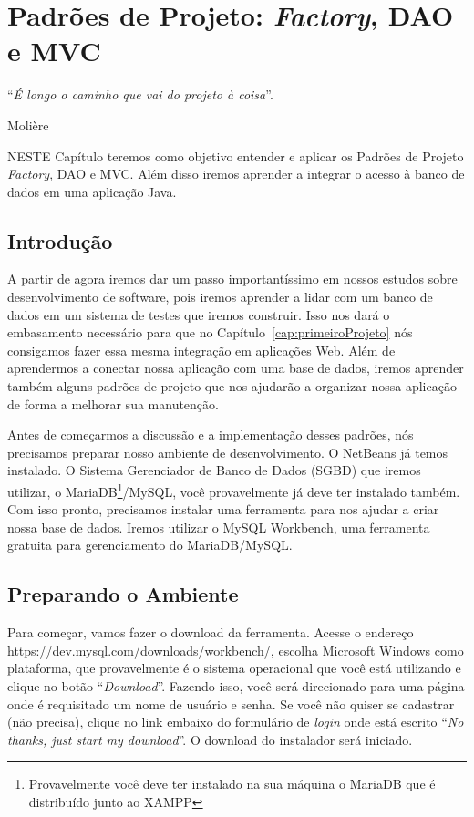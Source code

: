 \chapter{Padrões de Projeto: \textit{Factory}, DAO e MVC}\label{cap:padroesDeProjeto}
\epigraph{``\textit{É longo o caminho que vai do projeto à coisa}''.}{Molière}

\lettrine[lines=4, lhang=0.1, lraise=0, loversize=0.2, findent=0.1em]{\textcolor{corAzulTema}{N}}{ESTE} Capítulo teremos como objetivo entender e aplicar os Padrões de Projeto \textit{Factory}, DAO e MVC. Além disso iremos aprender a integrar o acesso à banco de dados em uma aplicação Java.


\section{Introdução}

A partir de agora iremos dar um passo importantíssimo em nossos estudos sobre desenvolvimento de software, pois iremos aprender a lidar com um banco de dados em um sistema de testes que iremos construir. Isso nos dará o embasamento necessário para que no Capítulo~\ref{cap:primeiroProjeto} nós consigamos fazer essa mesma integração em aplicações Web. Além de aprendermos a conectar nossa aplicação com uma base de dados, iremos aprender também alguns padrões de projeto que nos ajudarão a organizar nossa aplicação de forma a melhorar sua manutenção. 

Antes de começarmos a discussão e a implementação desses padrões, nós precisamos preparar nosso ambiente de desenvolvimento. O NetBeans já temos instalado. O Sistema Gerenciador de Banco de Dados (SGBD) que iremos utilizar, o MariaDB\footnote{Provavelmente você deve ter instalado na sua máquina o MariaDB que é distribuído junto ao XAMPP}/MySQL, você provavelmente já deve ter instalado também. Com isso pronto, precisamos instalar uma ferramenta para nos ajudar a criar nossa base de dados. Iremos utilizar o MySQL Workbench, uma ferramenta gratuita para gerenciamento do MariaDB/MySQL. 


\section{Preparando o Ambiente}\label{sec:preparandoAmbiente}

Para começar, vamos fazer o download da ferramenta. Acesse o endereço \url{https://dev.mysql.com/downloads/workbench/}, escolha Microsoft Windows como plataforma, que provavelmente é o sistema operacional que você está utilizando e clique no botão ``\textit{Download}''. Fazendo isso, você será direcionado para uma página onde é requisitado um nome de usuário e senha. Se você não quiser se cadastrar (não precisa), clique no link embaixo do formulário de \textit{login} onde está escrito ``\textit{No thanks, just start my download}''. O download do instalador será iniciado.

